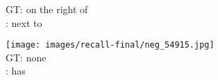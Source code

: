 \documentclass[10pt,twocolumn,letterpaper]{article}
\begin{document}
\begin{figure*}[t]
\begin{minipage}[b]{0.18\textwidth}
      	\vspace{0.2ex}
      	\small{
       	GT: on the right of\\
       	\cite{Lu16}: next to
       	}
       	\vspace{0.3ex}
    \end{minipage}
    \hspace{0.005\textwidth}
    \begin{minipage}[b]{0.18\textwidth}
    	\centering
       	\texttt{[image: images/recall-final/neg\_54915.jpg]} \\
       	\vspace{0.2ex}
       	\small{
       	GT: none\\
       	\cite{Lu16}: has
       	}
       	\vspace{0.3ex}
    \end{minipage}
     	

\end{figure*}
\end{document}
